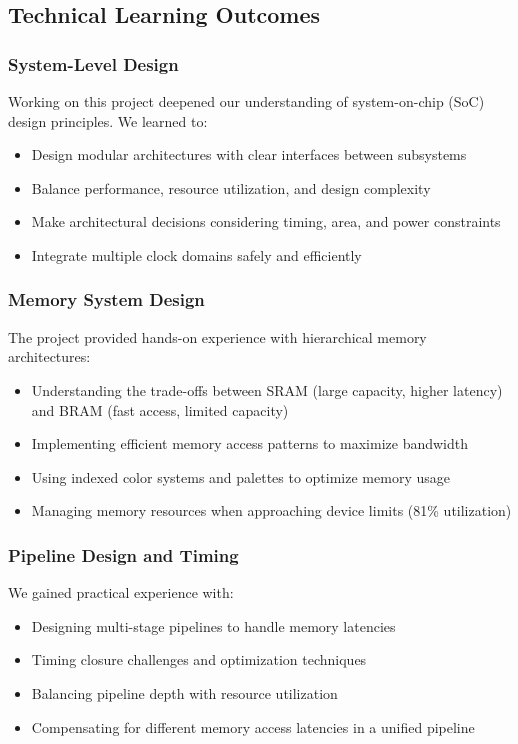 \documentclass[12pt,a4paper]{article}
\begin{document}
\subsection{Technical Learning Outcomes}

\subsubsection{System-Level Design}
Working on this project deepened our understanding of system-on-chip (SoC) design principles. We learned to:
\begin{itemize}
    \item Design modular architectures with clear interfaces between subsystems
    \item Balance performance, resource utilization, and design complexity
    \item Make architectural decisions considering timing, area, and power constraints
    \item Integrate multiple clock domains safely and efficiently
\end{itemize}

\subsubsection{Memory System Design}
The project provided hands-on experience with hierarchical memory architectures:
\begin{itemize}
    \item Understanding the trade-offs between SRAM (large capacity, higher latency) and BRAM (fast access, limited capacity)
    \item Implementing efficient memory access patterns to maximize bandwidth
    \item Using indexed color systems and palettes to optimize memory usage
    \item Managing memory resources when approaching device limits (81\% utilization)
\end{itemize}

\subsubsection{Pipeline Design and Timing}
We gained practical experience with:
\begin{itemize}
    \item Designing multi-stage pipelines to handle memory latencies
    \item Timing closure challenges and optimization techniques
    \item Balancing pipeline depth with resource utilization
    \item Compensating for different memory access latencies in a unified pipeline
\end{itemize}
\end{document}
